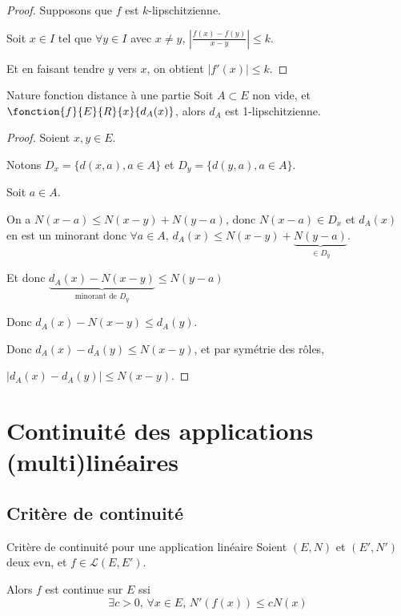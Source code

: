 \begin{proof}
    Supposons que $f$ est $k$-lipschitzienne. 

    Soit $x \in I$ tel que $\forall y \in I$ avec $x \neq y$, $\left|\frac{f(x) - f(y) }{x - y}\right| \leqslant k$. 

    Et en faisant tendre $y$ vers $x$, on obtient $|f'(x)| \leqslant k$.
\end{proof}

\begin{proposition}{Nature fonction distance à une partie}{}
    Soit $A \subset E$ non vide, et $\fonction{f}{E}{R}{x}{d_A(x)}$,
    alors $d_A$ est 1-lipschitzienne. 
\end{proposition}

\begin{proof}
    Soient $x, y \in E$. 

    Notons $D_x = \{d(x, a), a \in A\}$ et $D_y = \{d(y, a), a \in A\}$.

    Soit $a \in A$. 

    On a $N(x - a) \leqslant N(x - y) + N(y - a)$, donc $N(x - a) \in D_x$ et 
    $d_A(x)$ en est un minorant donc $\forall a \in A, \, d_A(x) \leqslant N(x - y) + \underbrace{N(y - a)}_{\in D_y}$.

    Et donc $\underbrace{d_A(x) - N(x - y)}_{\text{minorant de } D_y} \leqslant N(y - a)$

    Donc $d_A(x) - N(x - y) \leqslant d_A(y)$.

    Donc $d_A(x) - d_A(y) \leqslant N(x - y)$, et par symétrie des rôles, 

    $|d_A(x) - d_A(y)| \leqslant N(x - y)$.
\end{proof}


\section{Continuité des applications (multi)linéaires}

\subsection{Critère de continuité}

\begin{theorement}{Critère de continuité pour une application linéaire}{}
    Soient $(E, N)$ et $(E', N')$ deux evn, et $ f \in \mathscr L(E, E')$.

    Alors $f$ est continue sur $E$ ssi 
    $$\exists c > 0, \, \forall x \in E, \, N'(f(x)) \leqslant c N(x)$$
\end{theorement}


